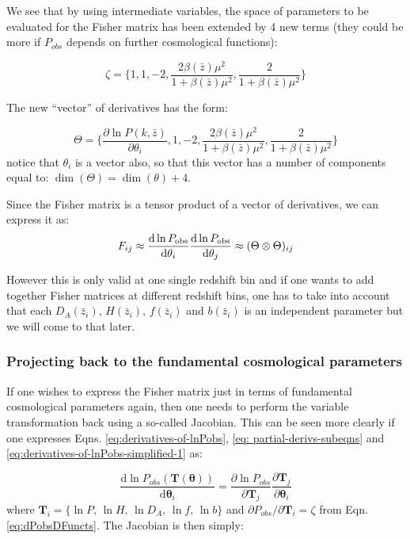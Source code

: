 We see that by using intermediate variables, the space of parameters
to be evaluated for the Fisher matrix has been extended by 4 new terms
(they could be more if $P_{obs}$ depends on further cosmological
functions): 

\begin{equation}
\zeta=\{1,1,-2,\frac{2\beta(\bar{z})\mu^{2}}{1+\beta(\bar{z})\mu^{2}},\frac{2}{1+\beta(\bar{z})\mu^{2}}\}\label{eq:dPobsDFuncts}
\end{equation}


The new ``vector'' of derivatives has the form:

\begin{equation}
\Theta=\{\frac{\partial\ln P(k,\bar{z})}{\partial\theta_{i}},1,-2,\frac{2\beta(\bar{z})\mu^{2}}{1+\beta(\bar{z})\mu^{2}},\frac{2}{1+\beta(\bar{z})\mu^{2}}\}\label{eq:bigThetaVector}
\end{equation}
notice that $\theta_{i}$ is a vector also, so that this vector has
a number of components equal to: $\dim(\Theta)=\dim(\theta)+4$.

Since the Fisher matrix is a tensor product of a vector of derivatives,
we can express it as:
\begin{equation}
F_{ij}\approx\frac{\mbox{d}\ln P_{{\rm obs}}}{\mbox{d}\theta_{i}}\frac{\mbox{d}\ln P_{{\rm obs}}}{\mbox{d}\theta_{j}}\approx(\Theta\otimes\Theta)_{ij}\label{eq:FisherTensorProd-1}
\end{equation}


However this is only valid at one single redshift bin and if one wants
to add together Fisher matrices at different redshift bins, one has
to take into account that each $D_{A}(\bar{z}_{i})$, $H(\bar{z}_{i})$,
$f(\bar{z}_{i})$ and $b(\bar{z}_{i})$ is an independent parameter
but we will come to that later. 


\subsubsection{Projecting back to the fundamental cosmological parameters}

If one wishes to express the Fisher matrix just in terms of fundamental
cosmological parameters again, then one needs to perform the variable
transformation back using a so-called Jacobian. This can be seen more
clearly if one expresses Eqns. \ref{eq:derivatives-of-lnPobs}, \ref{eq: partial-derivs-subeqns}
and \ref{eq:derivatives-of-lnPobs-simplified-1} as:

\begin{equation}
\frac{\mbox{d}\ln P_{obs}(\mathbf{T}(\boldsymbol{\theta}))}{\mbox{d}\boldsymbol{\theta}_{i}}=\frac{\partial\ln P_{obs}}{\partial\mathbf{T}{}_{j}}\frac{\partial\mathbf{T}_{j}}{\partial\boldsymbol{\theta}_{i}}
\end{equation}
where $\mathbf{T}_{i}=\{\ln P,\,\ln H,\,\ln D_{A},\,\ln f,\,\ln b\}$
and $\partial P_{obs}/\partial\mathbf{T}{}_{i}=\zeta$ from Eqn. \ref{eq:dPobsDFuncts}.
The Jacobian is then simply: 

